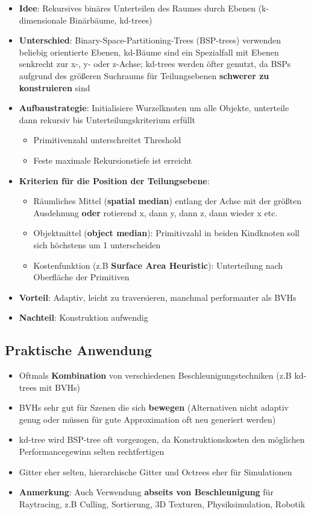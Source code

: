 \documentclass[10pt,a4paper]{article}
\begin{document}
	\begin{itemize}
		\item \textbf{Idee}: Rekursives binäres Unterteilen des Raumes durch Ebenen (k-dimensionale Binärbäume, kd-trees)
		\item \textbf{Unterschied}: Binary-Space-Partitioning-Trees (BSP-trees) verwenden beliebig orientierte Ebenen, kd-Bäume sind ein Spezialfall mit Ebenen senkrecht zur x-, y- oder z-Achse; kd-trees werden öfter genutzt, da BSPs aufgrund des größeren Suchraums für Teilungsebenen \textbf{schwerer zu konstruieren} sind
		\item \textbf{Aufbaustrategie}: Initialisiere Wurzelknoten um alle Objekte, unterteile dann rekursiv bis Unterteilungskriterium erfüllt
		\begin{itemize}
			\item Primitivenzahl unterschreitet Threshold
			\item Feste maximale Rekursionstiefe ist erreicht
		\end{itemize}
		\item \textbf{Kriterien für die Position der Teilungsebene}:
		\begin{itemize}
			\item Räumliches Mittel (\textbf{spatial median}) entlang der Achse mit der größten Ausdehnung \textbf{oder} rotierend x, dann y, dann z, dann wieder x etc.
			\item Objektmittel (\textbf{object median}): Primitivzahl in beiden Kindknoten soll sich höchstens um 1 unterscheiden
			\item Kostenfunktion (z.B \textbf{Surface Area Heuristic}): Unterteilung nach Oberfläche der Primitiven
		\end{itemize}
		\item \textbf{Vorteil}: Adaptiv, leicht zu traversieren, manchmal performanter als BVHs
		\item \textbf{Nachteil}: Konstruktion aufwendig
	\end{itemize}

	\subsection{Praktische Anwendung}
	\label{ds:sub:praktische_anwendung}

	\begin{itemize}
		\item Oftmals \textbf{Kombination} von verschiedenen Beschleunigungstechniken (z.B kd-trees mit BVHs)
		\item BVHs sehr gut für Szenen die sich \textbf{bewegen} (Alternativen nicht adaptiv genug oder müssen für gute Approximation oft neu generiert werden)
		\item kd-tree wird BSP-tree oft vorgezogen, da Konstruktionskosten den möglichen Performancegewinn selten rechtfertigen
		\item Gitter eher selten, hierarchische Gitter und Octrees eher für Simulationen
		\item \textbf{Anmerkung}: Auch Verwendung \textbf{abseits von Beschleunigung} für Raytracing, z.B Culling, Sortierung, 3D Texturen, Physiksimulation, Robotik
	\end{itemize}
	
\end{document}
